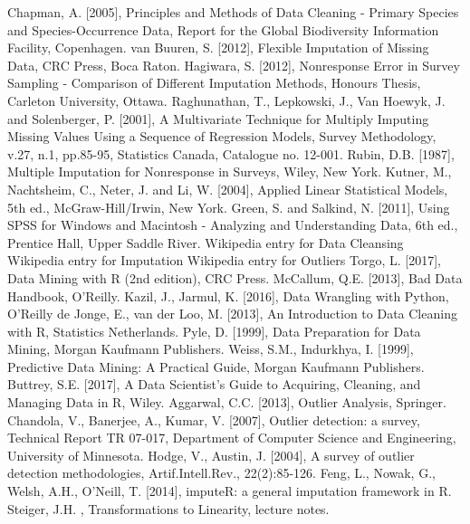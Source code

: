 \begin{thebibliography}{99}
Chapman, A. [2005], Principles and Methods of Data Cleaning - Primary Species and Species-Occurrence Data, Report for the Global Biodiversity Information Facility, Copenhagen.
van Buuren, S. [2012], Flexible Imputation of Missing Data, CRC Press, Boca Raton.
Hagiwara, S. [2012], Nonresponse Error in Survey Sampling - Comparison of Different Imputation Methods, Honours Thesis, Carleton University, Ottawa.
Raghunathan, T., Lepkowski, J., Van Hoewyk, J. and Solenberger, P. [2001], A Multivariate Technique for Multiply Imputing Missing Values Using a Sequence of Regression Models, Survey Methodology, v.27, n.1, pp.85-95, Statistics Canada, Catalogue no. 12-001.
Rubin, D.B. [1987], Multiple Imputation for Nonresponse in Surveys, Wiley, New York.
Kutner, M., Nachtsheim, C., Neter, J. and Li, W. [2004], Applied Linear Statistical Models, 5th ed., McGraw-Hill/Irwin, New York.
Green, S. and Salkind, N. [2011], Using SPSS for Windows and Macintosh - Analyzing and Understanding Data, 6th ed., Prentice Hall, Upper Saddle River.
Wikipedia entry for Data Cleansing 
Wikipedia entry for Imputation
Wikipedia entry for Outliers
Torgo, L. [2017], Data Mining with R (2nd edition), CRC Press.
McCallum, Q.E. [2013], Bad Data Handbook, O'Reilly.
Kazil, J., Jarmul, K. [2016], Data Wrangling with Python, O'Reilly
de Jonge, E., van der Loo, M. [2013], An Introduction to Data Cleaning with R, Statistics Netherlands.
Pyle, D. [1999], Data Preparation for Data Mining, Morgan Kaufmann Publishers.
Weiss, S.M., Indurkhya, I. [1999], Predictive Data Mining: A Practical Guide, Morgan Kaufmann Publishers.
Buttrey, S.E. [2017], A Data Scientist's Guide to Acquiring, Cleaning, and Managing Data in R, Wiley.
Aggarwal, C.C. [2013], Outlier Analysis, Springer.
Chandola, V., Banerjee, A., Kumar, V. [2007], Outlier detection: a survey, Technical Report TR 07-017, Department of Computer Science and Engineering, University of Minnesota.
Hodge, V., Austin, J. [2004], A survey of outlier detection methodologies, Artif.Intell.Rev., 22(2):85-126.
Feng, L., Nowak, G., Welsh, A.H., O'Neill, T. [2014], imputeR: a general imputation framework in R.
Steiger, J.H. , Transformations to Linearity, lecture notes.

\end{thebibliography}
